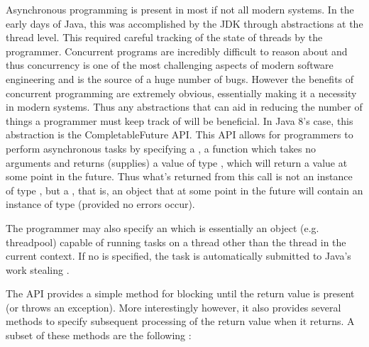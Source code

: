 


Asynchronous programming is present in most if not all modern systems. In the early days of Java, this was accomplished by the JDK through abstractions at the thread level. This required careful tracking of the state of threads by the programmer. Concurrent programs are incredibly difficult to reason about and thus concurrency is one of the most challenging aspects of modern software engineering and is the source of a huge number of bugs. However the benefits of concurrent programming are extremely obvious, essentially making it a necessity in modern systems. Thus any abstractions that can aid in reducing the number of things a programmer must keep track of will be beneficial. In Java 8's case, this abstraction is the CompletableFuture API. This API allows for programmers to perform asynchronous tasks by specifying a , a function which takes no arguments and returns (supplies) a value of type , which will return a value at some point in the future. Thus what's returned from this call is not an instance of type , but a , that is, an object that at some point in the future will contain an instance of type  (provided no errors occur). 

The programmer may also specify an  \cite{javaExecutor} which is essentially an object (e.g. threadpool) capable of running tasks on a thread other than the thread in the current context. If no  is specified, the task is automatically submitted to Java's work stealing  \cite{javaForkJoinPool}. 

The API provides a simple  method for blocking until the return value is present (or throws an exception). More interestingly however, it also provides several methods to specify subsequent processing of the return value when it returns. A subset of these methods are the following \cite{javaCfArticle}:

